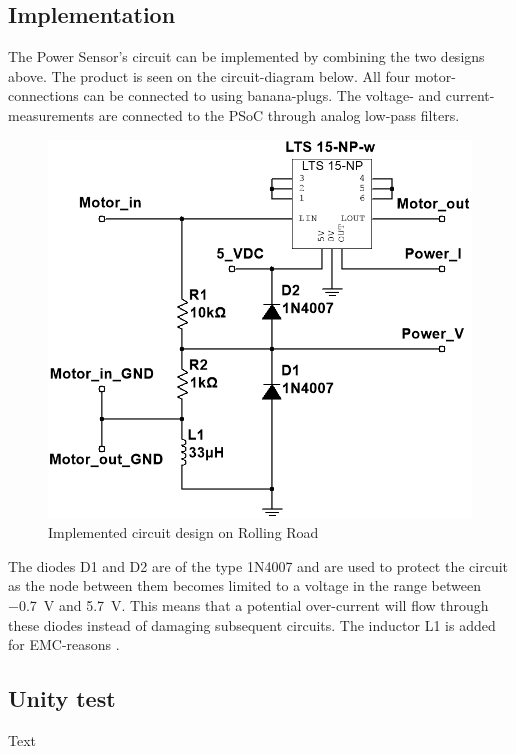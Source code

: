 \subsection{Implementation}
The Power Sensor's circuit can be implemented by combining the two designs above. The product is seen on the circuit-diagram below. All four motor-connections can be connected to using banana-plugs. The voltage- and current-measurements are connected to the PSoC through analog low-pass filters.

\begin{figure}[H]
	\centering
	\includegraphics[width=0.7\linewidth]{Hardware/Pictures/PowerSensor_circuit}
	\caption{Implemented circuit design on Rolling Road}
	\label{fig:PowerSensor_circuit}
\end{figure}

The diodes D1 and D2 are of the type 1N4007 and are used to protect the circuit as the node between them becomes limited to a voltage in the range between \SI{-0.7}{\volt} and \SI{5.7}{\volt}. This means that a potential over-current will flow through these diodes instead of damaging subsequent circuits. The inductor L1 is added for EMC-reasons .

\subsection{Unity test}
Text